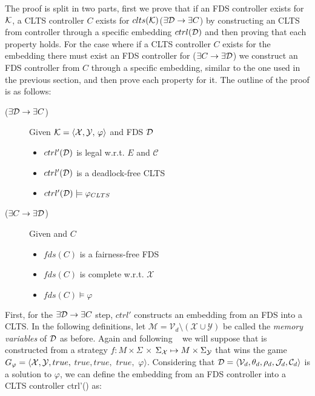 
The proof is split in two parts, first we prove that if an FDS \fdsD controller exists for $\mathcal{K}$, a CLTS controller $C$ exists for $clts(\mathcal{K})$($\exists \mathcal{D} \rightarrow \exists C$) by constructing an CLTS from controller \fdsD through a specific embedding $ctrl(\mathcal{D})$ and then proving that each property holds. For the case where if a CLTS controller $C$ exists for the embedding \cltsCPEmbedding there must exist an FDS controller for \fdsControlProblem ($\exists C \rightarrow \exists \mathcal{D}$) we construct an FDS controller from $C$ through a specific embedding, similar to the one used in the previous section, and then prove each property for it. The outline of the proof is as follows:


\begin{description}
	\item[($\exists \mathcal{D} \rightarrow \exists C$)] Given $\fdsControlProblemDef$ and FDS $\mathcal{D}$
		\begin{itemize}
			\item $ctrl'(\mathcal{D})$ is legal w.r.t. $E$ and $\mathcal{C}$
			\item $ctrl'(\mathcal{D})$ is a deadlock-free CLTS			
			\item $ctrl'(\mathcal{D}) \models \varphi_{CLTS}$
		\end{itemize}	
	\item[($\exists C \rightarrow \exists \mathcal{D}$)] Given \cltsCPEmbeddingDef and $C$
\begin{itemize}
	\item $fds(C)$ is a fairness-free FDS			
	\item $fds(C)$ is complete w.r.t. $\mathcal{X}$
	\item $fds(C) \models \varphi$
\end{itemize}	
\end{description}

First,  for the $\exists \mathcal{D} \rightarrow \exists C$ step, $ctrl'$ constructs an embedding from an FDS into a CLTS. In the following definitions, let $\mathcal{M}= \mathcal{V}_d\setminus (\mathcal{X} \cup \mathcal{Y})$ be called the \emph{memory variables} of $\mathcal{D}$ as before.
Again and following ~\cite{bloem2012synthesis} we will suppose that \fdsD is constructed from a strategy $f: M \times \Sigma$ $\times$ $\Sigma_{{\mathcal{X}}} \mapsto M \times \Sigma_{{\mathcal{Y}}}$
that wins the game $G_{\varphi}=\langle {\ensuremath{\mathcal{X}}}, {\mathcal{Y}}, true,$ $true, true,$ $true,$ $\varphi \rangle$. Considering that $\mathcal{D}= \langle \mathcal{V}_d, \theta_d, \rho_d, \mathcal{J}_d, \mathcal{C}_d\rangle$ is a solution to $\varphi$, we can define the embedding from an FDS controller \fdsD into a CLTS controller ctrl'(\fdsD)  as:

